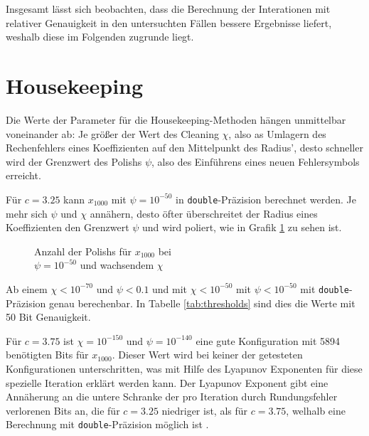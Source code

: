 Insgesamt lässt sich beobachten, dass die Berechnung der Interationen mit relativer Genauigkeit in den untersuchten Fällen bessere Ergebnisse liefert, weshalb diese im Folgenden zugrunde liegt.

\section{Housekeeping}
Die Werte der Parameter für die Housekeeping-Methoden hängen unmittelbar voneinander ab: Je größer der Wert des Cleaning $\chi$, also as Umlagern des Rechenfehlers eines Koeffizienten auf den Mittelpunkt des Radius', desto schneller wird der Grenzwert des Polishs $\psi$, also des Einführens eines neuen Fehlersymbols erreicht.

Für $c=3.25$ kann $x_{1000}$ mit $\psi = 10^{-50}$ in \verb+double+-Präzision berechnet werden. Je mehr sich $\psi$ und $\chi$ annähern, desto öfter überschreitet der Radius eines Koeffizienten den Grenzwert $\psi$ und wird poliert, wie in Grafik \ref{fig:polish} zu sehen ist.

\begin{figure}[ht]
    \centering
    \caption[Grenzwertvergleich]{Anzahl der Polishs für $x_{1000}$ bei \\ $\psi = 10^{-50}$ und wachsendem $\chi$}
    \label{fig:polish}
\end{figure}


Ab einem $\chi < 10^{-70}$ und $\psi < 0.1$ und mit $\chi < 10^{-50}$ mit $\psi < 10^{-50}$ mit \verb+double+-Präzision genau berechenbar. In Tabelle \ref{tab:thresholds} sind dies die Werte mit 50 Bit Genauigkeit.

Für $c = 3.75$ ist $\chi=10^{-150}$ und $\psi=10^{-140}$ eine gute Konfiguration mit 5894 benötigten Bits für $x_{1000}$. Dieser Wert wird bei keiner der getesteten Konfigurationen unterschritten, was mit Hilfe des Lyapunov Exponenten für diese spezielle Iteration erklärt werden kann. Der Lyapunov Exponent gibt eine Annäherung an die untere Schranke der pro Iteration durch Rundungsfehler verlorenen Bits an, die für $c=3.25$ niedriger ist, als für $c=3.75$, welhalb eine Berechnung mit \verb+double+-Präzision möglich ist \cite{DBLP:spandl}.

